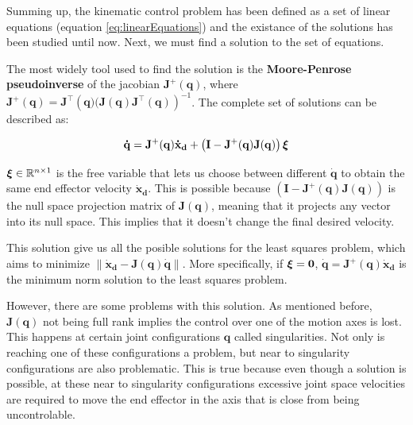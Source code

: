 Summing up, the kinematic control problem has been defined as a set of linear equations (equation \ref{eq:linearEquations}) and the existance of the solutions has been studied until now. Next, we must find a solution to the set of equations.

The most widely tool used to find the solution is the \textbf{Moore-Penrose pseudoinverse} of the jacobian $\mathbf{J}^{+}(\mathbf{{q}})$, where $\mathbf{J}^{+}(\mathbf{{q}}) = \mathbf{J}^{\top}\left(\mathbf{{q}})
(\mathbf{J}(\mathbf{{q}}) \mathbf{J}^{\top}(\mathbf{{q}})\right)^{-1}$.
The complete set of solutions can be described as:

\begin{equation}
    \label{eq:generalsolution}
    {\mathbf{\dot{q}}} =
    {\mathbf{J}^{+}(\mathbf{{q}})}
    {\mathbf{\dot{x}_{d}}}
    +
    \left({\mathbf{I}} - {\mathbf{J}^{+}(\mathbf{{q}})} {\mathbf{J}(\mathbf{{q}})}\right)
    {\mbox{\boldmath$\xi$}}
\end{equation}

$\mbox{\boldmath$\xi$} \in \mathbb{R}^{n \times 1}$ is the free variable that lets us choose between different $\mathbf{\dot{q}}$ to obtain the same end effector velocity $\mathbf{\dot{x}_{d}}$. This is possible because $\left({\mathbf{I}} - {\mathbf{J}^{+}(\mathbf{{q}})} {\mathbf{J}(\mathbf{{q}})}\right)$ is the null space projection matrix of $\mathbf{J}(\mathbf{{q}})$, meaning that it projects any vector into its null space. This implies that it doesn't change the final desired velocity.

This solution give us all the posible solutions for the least squares problem, which aims to minimize $\|\mathbf{\dot{x}_{d}} - \mathbf{J}(\mathbf{q}) \mathbf{\dot{q}}\|$. More specifically, if $\mbox{\boldmath$\xi$} = \mathbf{0}$,
$\mathbf{\dot{q}} ={\mathbf{J}^{+}(\mathbf{{q}})}{\mathbf{\dot{x}_{d}}}$
is the minimum norm solution to the least squares problem.

However, there are some problems with this solution. As mentioned before, $\mathbf{J}(\mathbf{{q}})$ not being full rank implies the control over one of the motion axes is lost. This happens at certain joint configurations $\mathbf{{q}}$ called singularities. Not only is reaching one of these configurations a problem, but near to singularity configurations are also problematic. This is true because even though a solution is possible, at these near to singularity configurations excessive joint space velocities are required to move the end effector in the axis that is close from being uncontrolable.

